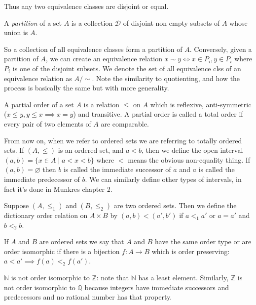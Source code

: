 Thus any two equivalence classes are disjoint or equal.

\begin{definition}
	A \textit{partition} of a set $A$ is a collection $\mathcal{D}$ of disjoint non empty subsets of $A$ whose union is $A$.
\end{definition}

So a collection of all equivalence classes form a partition of $A$. Conversely, given a partition of $A$, we can create an equivalence relation $x \sim y \iff x \in P_i, y \in P_i$ where $P_i$ is one of the disjoint subsets. We denote the set of all equivalence clss of an equivalence relation as $A/\sim$. Note the similarity to quotienting, and how the process is basically the same but with more generality.

\begin{definition}[Munkres]
A partial order of a set $A$ is a relation $\leq$ on $A$ which is reflexive, anti-symmetric ($x \leq y, y \leq x \implies x = y$) and transitive. A partial order is called a total order if every pair of two elements of $A$ are comparable.
\end{definition}
From now on, when we refer to ordered sets we are referring to totally ordered sets.
If $(A, \leq)$ is an ordered set, and $a < b$, then we define the open interval $(a, b) = \{x \in A\mid a < x < b\}$ where $<$ means the obvious non-equality thing. If $(a, b) = \varnothing$ then $b$ is called the immediate successor of $a$ and $a$ is called the immediate predecessor of $b$. We can similarly define other types of intervals, in fact it's done in Munkres chapter 2.

\begin{definition}
Suppose $(A, \leq_1)$ and $(B, \leq_2)$ are two ordered sets. Then we define the dictionary order relation on $A \times B$ by $(a, b) < (a', b')$ if $a <_1 a'$ or $a = a'$ and $b<_2 b$.
\end{definition}

\begin{definition}
If $A$ and $B$ are ordered sets we say that $A$ and $B$ have the same order type or are order isomorphic if there is a bijection $f: A \to B$ which is order preserving: $a < a' \implies f(a) <_2 f(a')$.
\end{definition}

$\mathbb{N}$ is not order isomorphic to $\mathbb{Z}$: note that $\mathbb{N}$ has a least element. Similarly, $\mathbb{Z}$ is not order isomorphic to $\mathbb{Q}$ because integers have immediate successors and predecessors and no rational number has that property.

